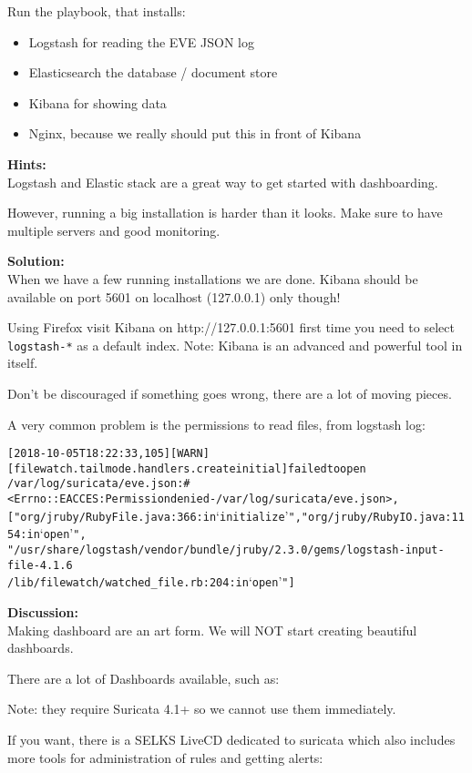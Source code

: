 \documentclass[a4paper,11pt,notitlepage]{report}
\begin{document}
Run the playbook, that installs:
\begin{itemize}
\item Logstash for reading the EVE JSON log
\item Elasticsearch the database / document store
\item Kibana for showing data
\item Nginx, because we really should put this in front of Kibana
\end{itemize}


{\bf Hints:}\\
Logstash and Elastic stack are a great way to get started with dashboarding.

However, running a big installation is harder than it looks. Make sure to have multiple servers and good monitoring.

{\bf Solution:}\\
When we have a few running installations we are done. Kibana should be available on port 5601 on localhost (127.0.0.1) only though!

Using Firefox visit Kibana on http://127.0.0.1:5601 first time you need to
 select \verb+logstash-*+ as a default index. Note: Kibana is an advanced and powerful tool in itself.

Don't be discouraged if something goes wrong, there are a lot of moving pieces.

A very common problem is the permissions to read files, from logstash log:
\begin{alltt}\small
[2018-10-05T18:22:33,105][WARN ][filewatch.tailmode.handlers.createinitial] failed to open
/var/log/suricata/eve.json: #<Errno::EACCES: Permission denied - /var/log/suricata/eve.json>,
["org/jruby/RubyFile.java:366:in `initialize'", "org/jruby/RubyIO.java:1154:in `open'",
 "/usr/share/logstash/vendor/bundle/jruby/2.3.0/gems/logstash-input-file-4.1.6
 /lib/filewatch/watched_file.rb:204:in `open'"]
\end{alltt}

{\bf Discussion:}\\
Making dashboard are an art form. We will NOT start creating beautiful dashboards.

There are a lot of Dashboards available, such as:\\

Note: they require Suricata 4.1+ so we cannot use them immediately.

If you want, there is a SELKS LiveCD dedicated to suricata which also includes more tools for administration of rules and getting alerts:\\
\end{document}
